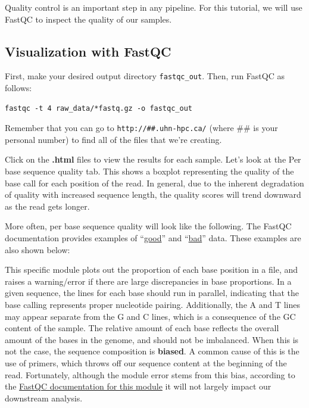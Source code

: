 \documentclass[
]{book}
\begin{document}
Quality control is an important step in any pipeline. For this tutorial, we will use FastQC to inspect the quality of our samples.

\subsection{Visualization with FastQC}\label{visualization-with-fastqc}

First, make your desired output directory \texttt{fastqc\_out}. Then, run FastQC as follows:

\begin{verbatim}
fastqc -t 4 raw_data/*fastq.gz -o fastqc_out
\end{verbatim}

Remember that you can go to \texttt{http://\#\#.uhn-hpc.ca/} (where \#\# is your personal number) to find all of the files that we're creating.

Click on the \textbf{.html} files to view the results for each sample. Let's look at the Per base sequence quality tab. This shows a boxplot representing the quality of the base call for each position of the read. In general, due to the inherent degradation of quality with increased sequence length, the quality scores will trend downward as the read gets longer.

More often, per base sequence quality will look like the following. The FastQC documentation provides examples of ``\href{https://www.bioinformatics.babraham.ac.uk/projects/fastqc/good_sequence_short_fastqc.html\#M1}{good}'' and ``\href{https://www.bioinformatics.babraham.ac.uk/projects/fastqc/bad_sequence_fastqc.html}{bad}'' data. These examples are also shown below:

This specific module plots out the proportion of each base position in a file, and raises a warning/error if there are large discrepancies in base proportions. In a given sequence, the lines for each base should run in parallel, indicating that the base calling represents proper nucleotide pairing. Additionally, the A and T lines may appear separate from the G and C lines, which is a consequence of the GC content of the sample. The relative amount of each base reflects the overall amount of the bases in the genome, and should not be imbalanced. When this is not the case, the sequence composition is \textbf{biased}. A common cause of this is the use of primers, which throws off our sequence content at the beginning of the read. Fortunately, although the module error stems from this bias, according to the \href{https://www.bioinformatics.babraham.ac.uk/projects/fastqc/Help/3\%20Analysis\%20Modules/4\%20Per\%20Base\%20Sequence\%20Content.html\#:~:text=Whilst\%20this\%20is\%20a\%20true\%20technical\%20bias\%2C\%20it\%20isn\%27t\%20something\%20which\%20can\%20be\%20corrected\%20by\%20trimming\%20and\%20in\%20most\%20cases\%20doesn\%27t\%20seem\%20to\%20adversely\%20affect\%20the\%20downstream\%20analysis.}{FastQC documentation for this module} it will not largely impact our downstream analysis.
\end{document}
